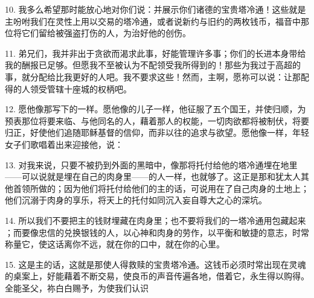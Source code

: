 10. 我多么希望那时能放心地对你们说：并展示你们诸德的宝贵塔冷通！这些就是主吩咐我们在灵性上用以交易的塔冷通，或者说新约与旧约的两枚钱币，福音中那位将它们留给被强盗打伤的人，为治好他的创伤。\par

11. 弟兄们，我并非出于贪欲而渴求此事，好能管理许多事；你们的长进本身带给我的酬报已足够。但愿我不至被认为不配领受我所得到的！那些为我过于高超的事，就分配给比我更好的人吧。我不要求这些！然而，主啊，愿祢可以说：让那配得的人领受管辖十座城的权柄吧。\par

12. 愿他像那写下的一样。愿他像的儿子一样，他征服了五个国王，并使归顺，为预表那位将要来临、与他同名的人，藉着那人的权能，一切肉欲都将被制伏，将要归正，好使他们追随耶稣基督的信仰，而非以往的追求与欲望。愿他像一样，年轻女子们歌唱着出来迎接他，说：\par

13. 对我来说，只要不被扔到外面的黑暗中，像那将托付给他的塔冷通埋在地里——可以说就是埋在自己的肉身里——的人一样，也就够了。这正是那和犹太人其他首领所做的；因为他们将托付给他们的主的话，可说用在了自己肉身的土地上；他们沉溺于肉身的享乐，将天上的托付如同沉入妄自尊大之心的深坑。\par

14. 所以我们不要把主的钱财埋藏在肉身里；也不要将我们的一塔冷通用包藏起来 ；而要像忠信的兑换银钱的人，以心神和肉身的劳作，以平衡和敏捷的意志，时常称量它，使这话离你不远，就在你的口中，就在你的心里。\par

15. 这是主的话，这就是那使人得救赎的宝贵塔冷通。这钱币必须时常出现在灵魂的桌案上，好能藉着不断交易，使良币的声音传遍各地，借着它，永生得以购得。全能圣父，祢白白赐予，为使我们认识\par

\par

